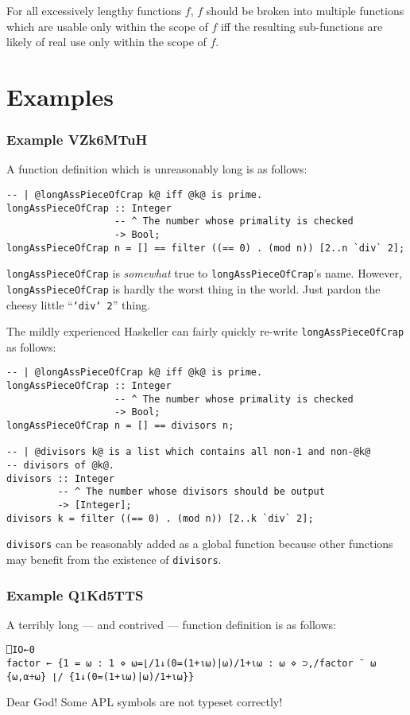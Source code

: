 \documentclass{report}
\begin{document}
For all excessively lengthy functions $f$, $f$ should be broken into multiple functions which are usable only within the scope of $f$ iff the resulting sub-functions are likely of real use only within the scope of $f$.
\section{Examples}
\subsubsection{Example VZk6MTuH}
A function definition which is unreasonably long is as follows:
\begin{lstlisting}
-- | @longAssPieceOfCrap k@ iff @k@ is prime.
longAssPieceOfCrap :: Integer
                   -- ^ The number whose primality is checked
                   -> Bool;
longAssPieceOfCrap n = [] == filter ((== 0) . (mod n)) [2..n `div` 2];
\end{lstlisting}
\texttt{longAssPieceOfCrap} is \textit{somewhat} true to \texttt{longAssPieceOfCrap}'s name.  However, \texttt{longAssPieceOfCrap} is hardly the worst thing in the world.  Just pardon the cheesy little ``\texttt{`div` 2}'' thing.

The mildly experienced Haskeller can fairly quickly re-write \texttt{longAssPieceOfCrap} as follows:
\begin{lstlisting}
-- | @longAssPieceOfCrap k@ iff @k@ is prime.
longAssPieceOfCrap :: Integer
                   -- ^ The number whose primality is checked
                   -> Bool;
longAssPieceOfCrap n = [] == divisors n;

-- | @divisors k@ is a list which contains all non-1 and non-@k@
-- divisors of @k@.
divisors :: Integer
         -- ^ The number whose divisors should be output
         -> [Integer];
divisors k = filter ((== 0) . (mod n)) [2..k `div` 2];
\end{lstlisting}
\texttt{divisors} can be reasonably added as a global function because other functions may benefit from the existence of \texttt{divisors}.
\subsubsection{Example Q1Kd5TTS}
A terribly long --- and contrived --- function definition is as follows:
\begin{lstlisting}
⎕IO←0
factor ← {1 = ⍵ : 1 ⋄ ⍵=⌊/1↓(0=(1+⍳⍵)|⍵)/1+⍳⍵ : ⍵ ⋄ ⊃,/factor ¨ ⍵ {⍵,⍺÷⍵} ⌊/ {1↓(0=(1+⍳⍵)|⍵)/1+⍳⍵}}
\end{lstlisting}
Dear God!  Some APL symbols are not typeset correctly!
\end{document}
